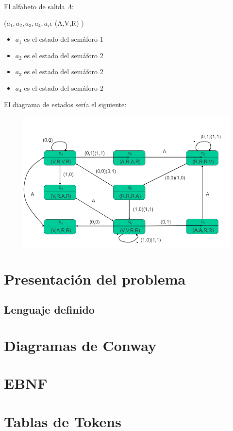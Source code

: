 \documentclass[12pt,a4paper]{article}
\begin{document}
El alfabeto de salida $\Lambda$: { ($a_{1},a_{2},a_{3},a_{4},a_{i}\epsilon$ (A,V,R) )
	\begin{itemize}
		\item $a_{1}$ es el estado del semáforo 1
		\item $a_{2}$ es el estado del semáforo 2
		\item $a_{3}$ es el estado del semáforo 2
		\item $a_{4}$ es el estado del semáforo 2
	\end{itemize}

	\begin{center}
		El diagrama de estados sería el siguiente:
	\end{center}

	\begin{figure}[h]
		\centering
		\includegraphics[width=0.7\linewidth]{3}
		\caption{}
		\label{fig:3}
	\end{figure}

	\newpage
	\section{Presentación del problema}
	\subsection{Lenguaje definido}
	\section{Diagramas de Conway}
	\section{EBNF}
	\section{Tablas de Tokens}
	\newpage
}
\end{document}
